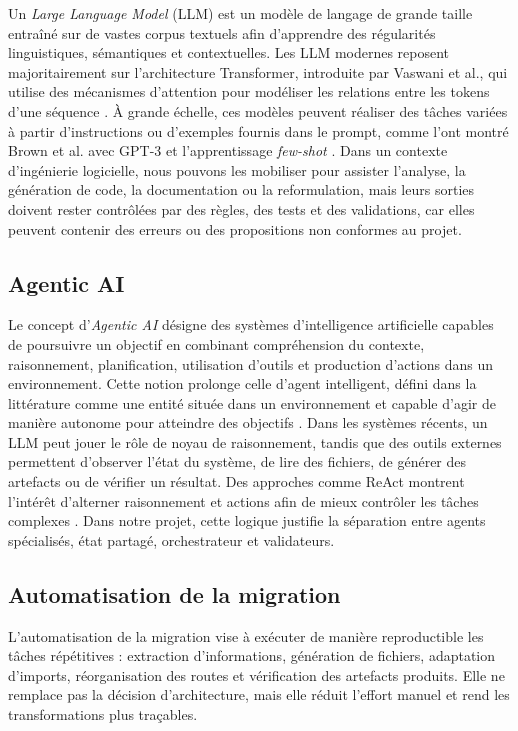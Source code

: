 Un \textit{Large Language Model} (LLM) est un modèle de langage de grande taille entraîné sur de vastes corpus textuels afin d'apprendre des régularités linguistiques, sémantiques et contextuelles. Les LLM modernes reposent majoritairement sur l'architecture Transformer, introduite par Vaswani et al., qui utilise des mécanismes d'attention pour modéliser les relations entre les tokens d'une séquence \cite{vaswani_attention_2017}. À grande échelle, ces modèles peuvent réaliser des tâches variées à partir d'instructions ou d'exemples fournis dans le prompt, comme l'ont montré Brown et al. avec GPT-3 et l'apprentissage \textit{few-shot} \cite{brown_language_models_2020}. Dans un contexte d'ingénierie logicielle, nous pouvons les mobiliser pour assister l'analyse, la génération de code, la documentation ou la reformulation, mais leurs sorties doivent rester contrôlées par des règles, des tests et des validations, car elles peuvent contenir des erreurs ou des propositions non conformes au projet.

\subsection{Agentic AI}

Le concept d'\textit{Agentic AI} désigne des systèmes d'intelligence artificielle capables de poursuivre un objectif en combinant compréhension du contexte, raisonnement, planification, utilisation d'outils et production d'actions dans un environnement. Cette notion prolonge celle d'agent intelligent, défini dans la littérature comme une entité située dans un environnement et capable d'agir de manière autonome pour atteindre des objectifs \cite{wooldridge_jennings_intelligent_agents_1995,wooldridge_introduction_2009}. Dans les systèmes récents, un LLM peut jouer le rôle de noyau de raisonnement, tandis que des outils externes permettent d'observer l'état du système, de lire des fichiers, de générer des artefacts ou de vérifier un résultat. Des approches comme ReAct montrent l'intérêt d'alterner raisonnement et actions afin de mieux contrôler les tâches complexes \cite{yao_react_2023}. Dans notre projet, cette logique justifie la séparation entre agents spécialisés, état partagé, orchestrateur et validateurs.

\subsection{Automatisation de la migration}

L'automatisation de la migration vise à exécuter de manière reproductible les tâches répétitives : extraction d'informations, génération de fichiers, adaptation d'imports, réorganisation des routes et vérification des artefacts produits. Elle ne remplace pas la décision d'architecture, mais elle réduit l'effort manuel et rend les transformations plus traçables.

